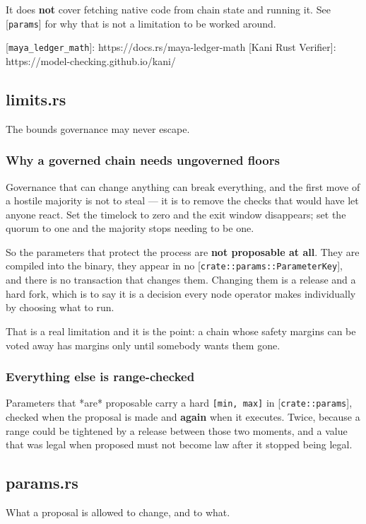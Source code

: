 \documentclass[11pt,a4paper]{article}
\begin{document}
It does \textbf{not} cover fetching native code from chain state and running it.
See [\texttt{params}] for why that is not a limitation to be worked around.

[\texttt{maya\_ledger\_math}]: https://docs.rs/maya-ledger-math
[Kani Rust Verifier]: https://model-checking.github.io/kani/

\subsection{limits.rs}
The bounds governance may never escape.

\subsubsection{Why a governed chain needs ungoverned floors}

Governance that can change anything can break everything, and the first move
of a hostile majority is not to steal — it is to remove the checks that would
have let anyone react. Set the timelock to zero and the exit window
disappears; set the quorum to one and the majority stops needing to be one.

So the parameters that protect the process are \textbf{not proposable at all}.
They are compiled into the binary, they appear in no
[\texttt{crate::params::ParameterKey}], and there is no transaction that changes
them. Changing them is a release and a hard fork, which is to say it is a
decision every node operator makes individually by choosing what to run.

That is a real limitation and it is the point: a chain whose safety margins
can be voted away has margins only until somebody wants them gone.

\subsubsection{Everything else is range-checked}

Parameters that *are* proposable carry a hard \texttt{[min, max]} in
[\texttt{crate::params}], checked when the proposal is made and \textbf{again} when it
executes. Twice, because a range could be tightened by a release between
those two moments, and a value that was legal when proposed must not become
law after it stopped being legal.

\subsection{params.rs}
What a proposal is allowed to change, and to what.
\end{document}
